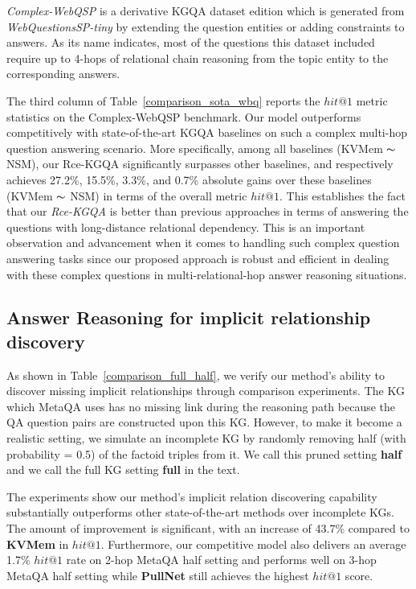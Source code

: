 \documentclass[pdflatex,sn-mathphys]{sn-jnl}%
\theoremstyle{thmstyleone}%
\theoremstyle{thmstyletwo}%
\theoremstyle{thmstylethree}%
\begin{document}
\textcolor[rgb]{1,0,0}{
\textit{Complex-WebQSP} \cite{he2021stu-teaQA} is a derivative KGQA dataset edition which is generated from \textit{WebQuestionsSP-tiny} by extending the question entities or adding constraints to answers. As its name indicates, most of the questions this dataset included require up to 4-hops of relational chain reasoning from the topic entity to the corresponding answers.}
 
 \textcolor[rgb]{1,0,0}{
The third column of Table~\ref{comparison_sota_wbq} reports the $hit@1$ metric statistics on the Complex-WebQSP benchmark. Our model outperforms competitively with state-of-the-art KGQA baselines on such a complex multi-hop question answering scenario. More specifically, among all baselines (KVMem $\thicksim$ NSM), our Rce-KGQA significantly surpasses other baselines, and respectively achieves 27.2\%, 15.5\%, 3.3\%, and 0.7\% absolute gains over these baselines (KVMem $\thicksim$ NSM) in terms of the overall metric $hit@1$. This establishes the fact that our \textit{Rce-KGQA} is better than previous approaches in terms of answering the questions with long-distance relational dependency. This is an important observation and advancement when it comes to handling such complex question answering tasks since our proposed approach is robust and efficient in dealing with these complex questions in multi-relational-hop answer reasoning situations.}


\subsection{Answer Reasoning for implicit relationship discovery}

As shown in Table~\ref{comparison_full_half}, we verify our method's ability to discover missing implicit relationships through comparison experiments. The KG which MetaQA uses has no missing link during the reasoning path because the QA question pairs are constructed upon this KG. However, to make it become a realistic setting, we simulate an incomplete KG by randomly removing half (with probability = 0.5) of the factoid triples from it.  We call this pruned setting \textbf{half} and we call the full KG setting \textbf{full} in the text.  

The experiments show our method's implicit relation discovering capability substantially outperforms other state-of-the-art methods  over incomplete KGs. The amount of improvement is significant, with  an increase of 43.7\% compared to \textbf{KVMem} in $hit@1$. Furthermore, our competitive model also delivers an average 1.7\% $hit@1$ rate on 2-hop MetaQA half setting and performs well on 3-hop MetaQA half setting while \textbf{PullNet} still achieves the highest $hit@1$ score.
\end{document}

